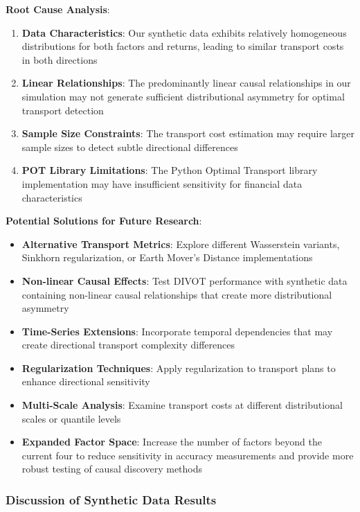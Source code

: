\textbf{Root Cause Analysis}:
\begin{enumerate}
    \item \textbf{Data Characteristics}: Our synthetic data exhibits relatively homogeneous distributions for both factors and returns, leading to similar transport costs in both directions
    \item \textbf{Linear Relationships}: The predominantly linear causal relationships in our simulation may not generate sufficient distributional asymmetry for optimal transport detection
    \item \textbf{Sample Size Constraints}: The transport cost estimation may require larger sample sizes to detect subtle directional differences
    \item \textbf{POT Library Limitations}: The Python Optimal Transport library implementation may have insufficient sensitivity for financial data characteristics
\end{enumerate}

\textbf{Potential Solutions for Future Research}:
\begin{itemize}
    \item \textbf{Alternative Transport Metrics}: Explore different Wasserstein variants, Sinkhorn regularization, or Earth Mover's Distance implementations
    \item \textbf{Non-linear Causal Effects}: Test DIVOT performance with synthetic data containing non-linear causal relationships that create more distributional asymmetry
    \item \textbf{Time-Series Extensions}: Incorporate temporal dependencies that may create directional transport complexity differences
    \item \textbf{Regularization Techniques}: Apply regularization to transport plans to enhance directional sensitivity
    \item \textbf{Multi-Scale Analysis}: Examine transport costs at different distributional scales or quantile levels
    \item \textbf{Expanded Factor Space}: Increase the number of factors beyond the current four to reduce sensitivity in accuracy measurements and provide more robust testing of causal discovery methods
\end{itemize}

\subsubsection*{Discussion of Synthetic Data Results}


